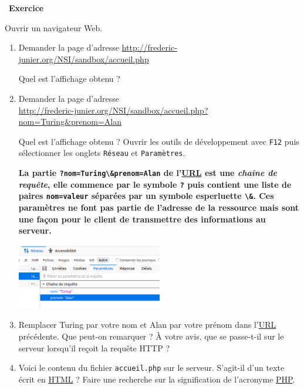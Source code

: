 \documentclass[
  11pt,
]{article}
\newcommand{\passthrough}[1]{#1}
\newcounter{exo}
\newenvironment{exercice}[1]
{\par \medskip   \addtocounter{exo}{1} \noindent  
\begin{bclogo}[arrondi =0.1,   noborder = true, logo=\bccrayon, marge=4]{~\textbf{Exercice} \textbf{\theexo} {\itshape #1} }  \par}
{
\end{bclogo}
 \par \bigskip }
\newcounter{rque}
\newcounter{def}
\begin{document}
\begin{exercice}{}

Ouvrir un navigateur Web.

\begin{enumerate}
\def\labelenumi{\arabic{enumi}.}
\item
  Demander la page d'adresse
  \href{https://frederic-junier.org/NSI/sandbox/accueil.php}{http://frederic-junier.org/NSI/sandbox/accueil.php}

  Quel est l'affichage obtenu ?
\item
  Demander la page d'adresse\\
  \href{https://frederic-junier.org/NSI/sandbox/accueil.php}{http://frederic-junier.org/NSI/sandbox/accueil.php?nom=Turing\&prenom=Alan}

  Quel est l'affichage obtenu ? Ouvrir les outils de développement avec
  \passthrough{\lstinline!F12!} puis sélectionner les onglets
  \passthrough{\lstinline!Réseau!} et
  \passthrough{\lstinline!Paramètres!}.

  \textbf{La partie \passthrough{\lstinline!?nom=Turing\&prenom=Alan!}
  de l'\href{https://developer.mozilla.org/fr/docs/Glossaire/URL}{URL}
  est une \emph{chaîne de requête}, elle commence par le symbole
  \passthrough{\lstinline!?!} puis contient une liste de paires
  \passthrough{\lstinline!nom=valeur!} séparées par un symbole
  esperluette \passthrough{\lstinline!\&!}. Ces paramètres ne font pas
  partie de l'adresse de la ressource mais sont une façon pour le client
  de transmettre des informations au serveur.}

  \includegraphics[width=0.5\textwidth,height=\textheight]{images/parametres1.png}\\
\item
  Remplacer Turing par votre nom et Alan par votre prénom dans
  l'\href{https://developer.mozilla.org/fr/docs/Glossaire/URL}{URL}
  précédente. Que peut-on remarquer ? À votre avis, que se passe-t-il
  sur le serveur lorsqu'il reçoit la requête HTTP ?
\item
  Voici le contenu du fichier \passthrough{\lstinline!accueil.php!} sur
  le serveur. S'agit-il d'un texte écrit en
  \href{https://developer.mozilla.org/fr/docs/Glossaire/HTML}{HTML} ?
  Faire une recherche sur la signification de l'acronyme
  \href{https://developer.mozilla.org/fr/docs/Glossaire/PHP}{PHP}.
\end{enumerate}


\end{exercice}
\end{document}
